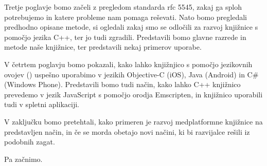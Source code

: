 Tretje poglavje bomo začeli z pregledom standarda \gls{rfc} 5545\cite{rfc5545}, zakaj ga sploh potrebujemo in katere probleme nam pomaga reševati. Nato bomo pregledali predhodno opisane metode, si ogledali zakaj smo se odločili za razvoj knjižnice s pomočjo jezika C++, ter jo tudi zgradili. Predstavili bomo glavne razrede in metode naše knjižnice, ter predstavili nekaj primerov uporabe.

V četrtem poglavju bomo pokazali, kako lahko knjižnjico s pomočjo jezikovnih ovojev () uspešno uporabimo v jezikih Objective-C (iOS), Java (Android) in C\# (Windows Phone). Predstavili bomo tudi način, kako lahko C++ knjižnico prevedemo v jezik JavaScript s pomočjo orodja Emscripten\cite{emscripten}, in knjižnico uporabili tudi v spletni aplikaciji.

V zaključku bomo pretehtali, kako primeren je razvoj medplatformne knjižnice na predstavljen način, in če se morda obetajo novi načini, ki bi razvijalce rešili iz podobnih zagat.

Pa začnimo.
